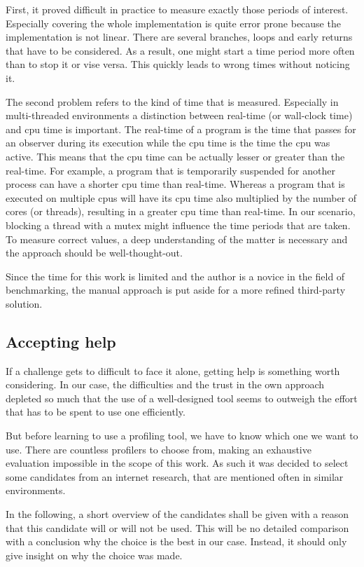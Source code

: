 First, it proved difficult in practice to measure exactly those periods of interest. Especially covering the whole implementation is quite error prone because the implementation is not linear. There are several branches, loops and early returns that have to be considered. As a result, one might start a time period more often than to stop it or vise versa. This quickly leads to wrong times without noticing it.

The second problem refers to the kind of time that is measured. Especially in multi-threaded environments a distinction between real-time (or wall-clock time) and cpu time is important. The real-time of a program is the time that passes for an observer during its execution while the cpu time is the time the cpu was active. This means that the cpu time can be actually lesser or greater than the real-time. For example, a program that is temporarily suspended for another process can have a shorter cpu time than real-time. Whereas a program that is executed on multiple cpus will have its cpu time also multiplied by the number of cores (or threads), resulting in a greater cpu time than real-time. In our scenario, blocking a thread with a mutex might influence the time periods that are taken. To measure correct values, a deep understanding of the matter is necessary and the approach should be well-thought-out.

Since the time for this work is limited and the author is a novice in the field of benchmarking, the manual approach is put aside for a more refined third-party solution.

\subsection{Accepting help}
If a challenge gets to difficult to face it alone, getting help is something worth considering. In our case, the difficulties and the trust in the own approach depleted so much that the use of a well-designed tool seems to outweigh the effort that has to be spent to use one efficiently.

But before learning to use a profiling tool, we have to know which one we want to use. There are countless profilers to choose from, making an exhaustive evaluation impossible in the scope of this work. As such it was decided to select some candidates from an internet research, that are mentioned often in similar environments.

In the following, a short overview of the candidates shall be given with a reason that this candidate will or will not be used. This will be no detailed comparison with a conclusion why the choice is the best in our case. Instead, it should only give insight on why the choice was made.

